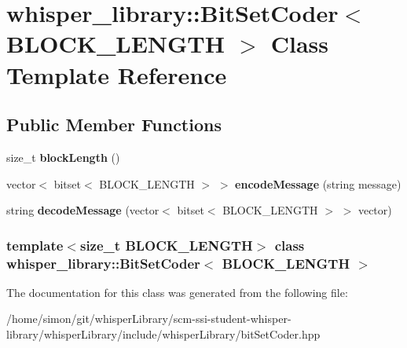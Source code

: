 \hypertarget{classwhisper__library_1_1BitSetCoder}{\section{whisper\-\_\-library\-:\-:\-Bit\-Set\-Coder$<$ \-B\-L\-O\-C\-K\-\_\-\-L\-E\-N\-G\-T\-H $>$ \-Class \-Template \-Reference}
\label{classwhisper__library_1_1BitSetCoder}
}
\subsection*{\-Public \-Member \-Functions}
\begin{DoxyCompactItemize}
\item 
\hypertarget{classwhisper__library_1_1BitSetCoder_a78072e1d098b177ac51a7007564e8eb6}{size\-\_\-t {\bfseries block\-Length} ()}\label{classwhisper__library_1_1BitSetCoder_a78072e1d098b177ac51a7007564e8eb6}

\item 
\hypertarget{classwhisper__library_1_1BitSetCoder_a04977549fac58c4750df77a75d4452d8}{vector$<$ bitset$<$ \-B\-L\-O\-C\-K\-\_\-\-L\-E\-N\-G\-T\-H $>$ $>$ {\bfseries encode\-Message} (string message)}\label{classwhisper__library_1_1BitSetCoder_a04977549fac58c4750df77a75d4452d8}

\item 
\hypertarget{classwhisper__library_1_1BitSetCoder_a96721c4d4f5e5faf36873972634a03fc}{string {\bfseries decode\-Message} (vector$<$ bitset$<$ \-B\-L\-O\-C\-K\-\_\-\-L\-E\-N\-G\-T\-H $>$ $>$ vector)}\label{classwhisper__library_1_1BitSetCoder_a96721c4d4f5e5faf36873972634a03fc}

\end{DoxyCompactItemize}
\subsubsection*{template$<$size\-\_\-t \-B\-L\-O\-C\-K\-\_\-\-L\-E\-N\-G\-T\-H$>$ class whisper\-\_\-library\-::\-Bit\-Set\-Coder$<$ B\-L\-O\-C\-K\-\_\-\-L\-E\-N\-G\-T\-H $>$}



\-The documentation for this class was generated from the following file\-:\begin{DoxyCompactItemize}
\item 
/home/simon/git/whisper\-Library/scm-\/ssi-\/student-\/whisper-\/library/whisper\-Library/include/whisper\-Library/bit\-Set\-Coder.\-hpp\end{DoxyCompactItemize}
